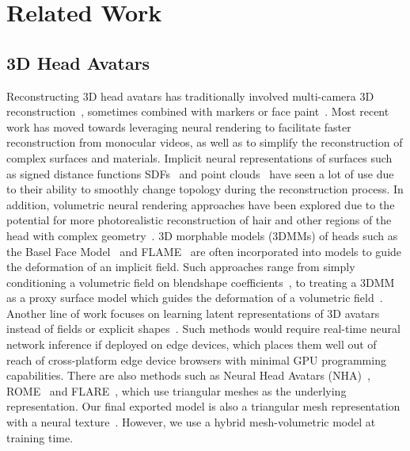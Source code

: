 \section{Related Work}

\subsection{3D Head Avatars}

Reconstructing 3D head avatars has traditionally involved multi-camera 3D reconstruction~\cite{bradley2010high,beeler2010high}, sometimes combined with markers or face paint~\cite{furukawa2009dense}. 
Most recent work has moved towards leveraging neural rendering to facilitate faster reconstruction from monocular videos, as well as to simplify the reconstruction of complex surfaces and materials. 
Implicit neural representations of surfaces such as signed distance functions SDFs~\cite{zheng2022avatar} and point clouds~\cite{zheng2023pointavatar, wang2023npbva} have seen a lot of use due to their ability to smoothly change topology during the reconstruction process. 
In addition, volumetric neural rendering approaches have been explored due to the potential for more photorealistic reconstruction of hair and other regions of the head with complex geometry~\cite{lombardi2019neural, lombardi2021mvp, cao2022ava}.
3D morphable models (3DMMs) of heads such as the Basel Face Model~\cite{blanz1999bfm} and FLAME~\cite{li2017flame} are often incorporated into models to guide the deformation of an implicit field. 
Such approaches range from simply conditioning a volumetric field on blendshape coefficients~\cite{gafni2021nerface}, to treating a 3DMM as a proxy surface model which guides the deformation of a volumetric field~\cite{athar2022rignerf,athar2023flameinnerf,bai2023monoavatar,zielonka2023insta}. 
Another line of work focuses on learning latent representations of 3D avatars instead of fields or explicit shapes~\cite{xu2023latentavatar,ma2021pixel}. 
Such methods would require real-time neural network inference if deployed on edge devices, which places them well out of reach of cross-platform edge device browsers with minimal GPU programming capabilities.
There are also methods such as Neural Head Avatars (NHA)~\cite{grassal2022nha}, ROME~\cite{khakhulin2022rome} and FLARE~\cite{bharadwaj2023flare}, which use triangular meshes as the underlying representation.
Our final exported model is also a triangular mesh representation with a neural texture~\cite{thies2019deferred}. However, we use a hybrid mesh-volumetric model at training time.

